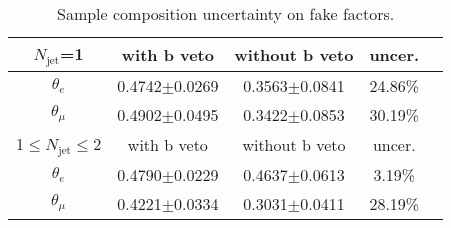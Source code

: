 \begin{table}[h]
\begin{center}
\begin{tabular}{c|cccc}
\hline
\hline
$N_{\text{jet}}$=1 &with b veto &without b veto  &uncer.  \\
\hline
$\theta_{e}$ &0.4742$\pm$0.0269    &0.3563$\pm$0.0841 &24.86\% \\
$\theta_{\mu}$ &0.4902$\pm$0.0495   &0.3422$\pm$0.0853 &30.19\% \\
\hline
\hline
1$\leq N_{\text{jet}} \leq$2 &with b veto &without b veto  &uncer.  \\
\hline
$\theta_{e}$  &0.4790$\pm$0.0229   &0.4637$\pm$0.0613  &3.19\%  \\
$\theta_{\mu}$  &0.4221$\pm$0.0334  &0.3031$\pm$0.0411 &28.19\%  \\
\hline
\hline
\end{tabular}
\caption{Sample composition uncertainty on fake factors.}
\label{tab:ff_syst_sample_composition}
\end{center}
\end{table}
